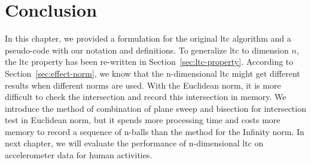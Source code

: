 \section{Conclusion}
In this chapter, we provided a formulation for the original \acrshort{ltc}
algorithm and a pseudo-code with our notation and definitions. To generalize
\acrshort{ltc} to dimension $n$, the \acrshort{ltc} property has been re-written
in Section~\ref{sec:ltc-property}. According to Section~\ref{sec:effect-norm},
we know that the n-dimensional \acrshort{ltc} might get different results when
different norms are used. With the Euclidean norm, it is more difficult to check
the intersection and record this intersection in memory. We introduce the method
of combination of plane sweep and bisection for intersection test in Euclidean
norm, but it spends more processing time and costs more memory to record a
sequence of n-balls than the method for the Infinity norm. In next chapter, we
will evaluate the performance of n-dimensional \acrshort{ltc} on accelerometer
data for human activities. 
